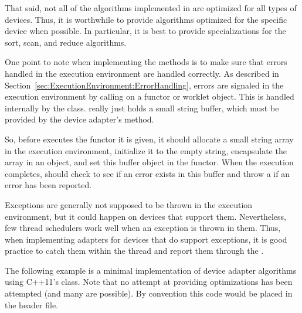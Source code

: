 That said, not all of the algorithms implemented in
 are optimized for all types
of devices. Thus, it is worthwhile to provide algorithms optimized for the
specific device when possible. In particular, it is best to provide
specializations for the sort, scan, and reduce algorithms.

One point to note when implementing the  methods is to
make sure that errors handled in the execution environment are handled
correctly. As described in
Section~\ref{sec:ExecutionEnvironment:ErrorHandling}, errors are signaled
in the execution environment by calling  on a functor
or worklet object. This is handled internally by the
 class.
 really just holds a small string
buffer, which must be provided by the device adapter's 
method.

So, before  executes the functor it is given, it should
allocate a small string array in the execution environment, initialize it
to the empty string, encapsulate the array in an
 object, and set this buffer object in
the functor. When the execution completes,  should check
to see if an error exists in this buffer and throw a
 if an error has been reported.

\begin{commonerrors}
  Exceptions are generally not supposed to be thrown in the execution
  environment, but it could happen on devices that support them.
  Nevertheless, few thread schedulers work well when an exception is thrown
  in them. Thus, when implementing adapters for devices that do support
  exceptions, it is good practice to catch them within the thread and
  report them through the .
\end{commonerrors}

The following example is a minimal implementation of device adapter
algorithms using C++11's  class. Note that no attempt
at providing optimizations has been attempted (and many are possible). By
convention this code would be placed in the
header file.


